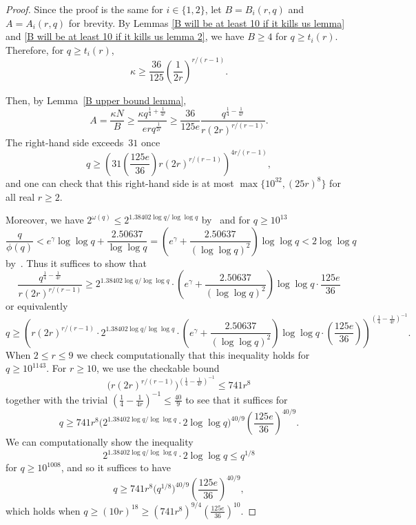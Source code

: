 \documentclass[12pt]{amsart}
\theoremstyle{plain}
\theoremstyle{definition}
\begin{document}
\begin{proof}
Since the proof is the same for $i\in \{1, 2\}$, let $B = B_i(r,q)$ and $A = A_i(r,q)$ for brevity. By Lemmas  \ref{B will be at least 10 if it kills us lemma} and \ref{B will be at least 10 if it kills us lemma 2}, we have $B\ge 4$ for $q\ge t_i(r)$.   
Therefore, for $q\ge t_i(r)$,
$$\kappa \ge \frac{36}{125}\left(\frac{1}{2r}\right)^{r/(r-1)}.$$

Then, by Lemma~\ref{B upper bound lemma},
\[
A = \frac{\kappa N}B \ge \frac{\kappa q^{\frac{1}{4}+\frac{1}{4r}}}{erq^{\frac{1}{2r}}} \ge \frac{36}{125e}\frac{q^{\frac{1}{4}-\frac{1}{4r}}}{r(2r)^{r/(r-1)}}.
\]
The right-hand side exceeds~$31$ once
\[
q \ge \left( 31\left(\frac{125e}{36}\right)r(2r)^{r/(r-1)} \right)^{4r/(r-1)},
\]
and one can check that this right-hand side is at most $\max\{10^{32},(25r)^8\}$ for all real $r\ge2$.

Moreover, we have $2^{\omega(q)} \le 2^{1.38402\log q/\log\log q}$ by~\cite{Nicolas-Robin1983} and for $q\ge 10^{13}$
\[
\frac q{\phi(q)} < e^\gamma \log\log q + \frac{2.50637}{\log\log q} = \left(e^{\gamma}+\frac{2.50637}{(\log{\log{q}})^2}\right)\log\log q < 2\log\log{q}
\]
by~\cite[Theorem~15]{RS1962}. Thus it suffices to show that
\[
\frac{q^{\frac{1}{4}-\frac{1}{4r}}}{r(2r)^{r/(r-1)}} \ge 2^{1.38402\log q/\log\log q}\cdot \left(e^{\gamma}+\frac{2.50637}{(\log{\log{q}})^2}\right)\log\log q \cdot \frac{125e}{36}
\]
or equivalently
\[
q \ge \left( r(2r)^{r/(r-1)} \cdot 2^{1.38402\log q/\log\log q}\cdot \left(e^{\gamma}+\frac{2.50637}{(\log{\log{q}})^2}\right)\log\log q \cdot\left(\frac{125e}{36}\right)\right)^{(\frac{1}{4}-\frac{1}{4r})^{-1}}.
\]
When $2\le r\le 9$ we check computationally that this inequality holds for $q\ge10^{1143}$. For $r\ge10$, we use the checkable bound
\[
\bigl( r(2r)^{r/(r-1)} \bigr)^{(\frac{1}{4}-\frac{1}{4r})^{-1}} \le 741r^8
\]
together with the trivial $(\frac{1}{4}-\frac{1}{4r})^{-1} \le \frac{40}9$ to see that it suffices for
\[
q \ge 741r^8 \bigl( 2^{1.38402\log q/\log\log q}\cdot 2\log\log q \big)^{40/9}\left(\frac{125e}{36}\right)^{40/9}.
\]
We can computationally show the inequality
\[
2^{1.38402\log q/\log\log q}\cdot 2\log\log q \le q^{1/8}
\]
for $q\ge 10^{1008}$, and so it suffices to have
\[
q \ge 741r^8 \bigl( q^{1/8} \big)^{40/9}\left(\frac{125e}{36}\right)^{40/9},
\]
which holds when $q\ge (10r)^{18} \ge (741r^8)^{9/4}\left(\frac{125e}{36}\right)^{10}$.
\end{proof}
\end{document}
